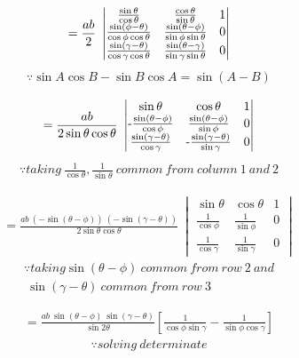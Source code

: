 \documentclass[journal,12pt,twocolumn]{IEEEtran}
\begin{document}
\begin{multline}
=\frac{ab}{2}~\begin{vmatrix}
 \frac{\sin\theta}{\cos\theta} & \frac{\cos\theta}{\sin\theta} & 1  \\ 
 \frac{\sin(\phi-\theta)}{\cos\phi\cos\theta} & \frac{\sin(\theta-\phi)}{\sin\phi\sin\theta} & 0  \\
 \frac{\sin(\gamma-\theta)}{\cos\gamma\cos\theta} & \frac{\sin(\theta-\gamma)}{\sin\gamma\sin\theta} & 0 
\end{vmatrix}    
\end{multline}
\begin{align*}
\because \sin A\cos B - \sin B\cos A = \sin(A-B)
\end{align*}

\begin{multline}
=\frac{ab}{2 \sin\theta\cos\theta}~\mydet{
 {\sin\theta} & {\cos\theta} & 1  \\ $-$
 \frac{\sin(\theta-\phi)}{\cos\phi} & \frac{\sin(\theta-\phi)}{\sin\phi} & 0  \\
 \frac{\sin(\gamma-\theta)}{\cos\gamma} &$-$ \frac{\sin(\gamma-\theta)}{\sin\gamma} & 0 
}
\end{multline}
\begin{align*}
\because taking ~ \frac{1}{\cos\theta},\frac{1}{\sin\theta}~common ~from ~column~ 1 ~and~ 2
\end{align*}


\begin{multline}
=\frac{ab~(-\sin(\theta-\phi))~(-\sin(\gamma-\theta))}{2 \sin\theta\cos\theta}~\begin{vmatrix}
 {\sin\theta} & {\cos\theta} & 1  \\ 
 \frac{1}{\cos\phi} & \frac{1}{\sin\phi} & 0  \\
 \frac{1}{\cos\gamma} & \frac{1}{\sin\gamma} & 0 
\end{vmatrix}    
\end{multline}
\begin{align*}
\because taking \sin(\theta-\phi)~common ~from ~row ~2
~and\\~\sin(\gamma-\theta)~common ~from ~row ~3
\end{align*}


\begin{multline}
=\frac{ab~\sin(\theta-\phi)~\sin(\gamma-\theta)}{ \sin2\theta}\left[\frac{1}{\cos\phi\sin\gamma}-\frac{1}{\sin\phi\cos\gamma}
\right]
\end{multline}
\begin{align*}
\because solving~determinate 
\end{align*}
\end{document}
